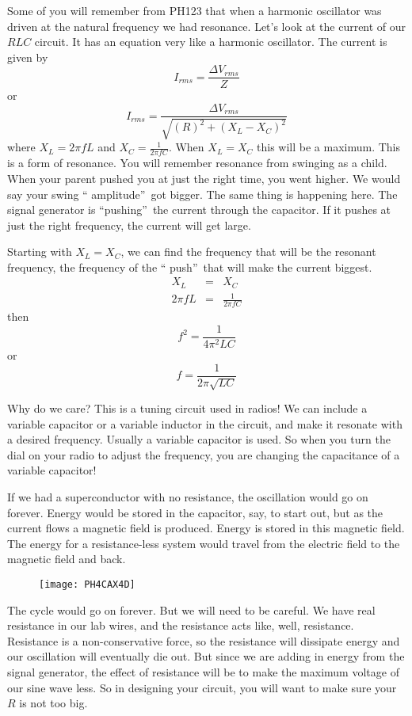 Some of you will remember from PH123 that when a harmonic oscillator was
driven at the natural frequency we had resonance. Let's look at the current
of our $RLC$ circuit. It has an equation very like a harmonic oscillator.
The current is given by%
\begin{equation*}
I_{rms}=\frac{\Delta V_{rms}}{Z}
\end{equation*}%
or 
\begin{equation*}
I_{rms}=\frac{\Delta V_{rms}}{\sqrt{\left( R\right) ^{2}+\left(
X_{L}-X_{C}\right) ^{2}}}
\end{equation*}%
where $X_{L}=2\pi fL$ and $X_{C}=\frac{1}{2\pi fC}.$ When $X_{L}=X_{C}$ this
will be a maximum. This is a form of resonance. You will remember resonance
from swinging as a child. When your parent pushed you at just the right
time, you went higher. We would say your swing \textquotedblleft
amplitude\textquotedblright\ got bigger. The same thing is happening here.
The signal generator is \textquotedblleft pushing\textquotedblright\ the
current through the capacitor. If it pushes at just the right frequency, the
current will get large.

Starting with $X_{L}=X_{C}$, we can find the frequency that will be the
resonant frequency, the frequency of the \textquotedblleft
push\textquotedblright\ that will make the current biggest.%
\begin{eqnarray*}
X_{L} &=&X_{C} \\
2\pi fL &=&\frac{1}{2\pi fC}
\end{eqnarray*}%
then%
\begin{equation*}
f^{2}=\frac{1}{4\pi ^{2}LC}
\end{equation*}%
or%
\begin{equation}
f=\frac{1}{2\pi \sqrt{LC}}  \label{Resonance Frequecy}
\end{equation}

Why do we care? This is a tuning circuit used in radios! We can include a
variable capacitor or a variable inductor in the circuit, and make it
resonate with a desired frequency. Usually a variable capacitor is used. So
when you turn the dial on your radio to adjust the frequency, you are
changing the capacitance of a variable capacitor!

If we had a superconductor with no resistance, the oscillation would go on
forever. Energy would be stored in the capacitor, say, to start out, but as
the current flows a magnetic field is produced. Energy is stored in this
magnetic field. The energy for a resistance-less system would travel from
the electric field to the magnetic field and back.\begin{figure}[h!]
\texttt{[image: PH4CAX4D]}
\end{figure}The cycle would go on forever.
But we will need to be careful. We have real resistance in our lab wires,
and the resistance acts like, well, resistance. Resistance is a
non-conservative force, so the resistance will dissipate energy and our
oscillation will eventually die out. But since we are adding in energy from
the signal generator, the effect of resistance will be to make the maximum
voltage of our sine wave less. So in designing your circuit, you will want
to make sure your $R$ is not too big.

